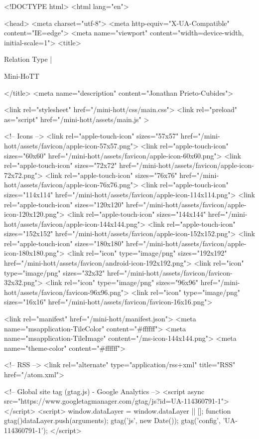<!DOCTYPE html>
<html lang="en">

<head>
  <meta charset="utf-8">
  <meta http-equiv="X-UA-Compatible" content="IE=edge">
  <meta name="viewport" content="width=device-width, initial-scale=1">
  <title>
    
      
        Relation Type |
      
        Mini-HoTT
    
  </title>
  <meta name="description" content="Jonathan Prieto-Cubides">

  <link rel="stylesheet" href="/mini-hott/css/main.css">
  <link rel="preload" as="script" href="/mini-hott/assets/main.js" >

  <!-- Icons -->
  <link rel="apple-touch-icon" sizes="57x57" href="/mini-hott/assets/favicon/apple-icon-57x57.png">
  <link rel="apple-touch-icon" sizes="60x60" href="/mini-hott/assets/favicon/apple-icon-60x60.png">
  <link rel="apple-touch-icon" sizes="72x72" href="/mini-hott/assets/favicon/apple-icon-72x72.png">
  <link rel="apple-touch-icon" sizes="76x76" href="/mini-hott/assets/favicon/apple-icon-76x76.png">
  <link rel="apple-touch-icon" sizes="114x114" href="/mini-hott/assets/favicon/apple-icon-114x114.png">
  <link rel="apple-touch-icon" sizes="120x120" href="/mini-hott/assets/favicon/apple-icon-120x120.png">
  <link rel="apple-touch-icon" sizes="144x144" href="/mini-hott/assets/favicon/apple-icon-144x144.png">
  <link rel="apple-touch-icon" sizes="152x152" href="/mini-hott/assets/favicon/apple-icon-152x152.png">
  <link rel="apple-touch-icon" sizes="180x180" href="/mini-hott/assets/favicon/apple-icon-180x180.png">
  <link rel="icon" type="image/png" sizes="192x192"  href="/mini-hott/assets/favicon/android-icon-192x192.png">
  <link rel="icon" type="image/png" sizes="32x32" href="/mini-hott/assets/favicon/favicon-32x32.png">
  <link rel="icon" type="image/png" sizes="96x96" href="/mini-hott/assets/favicon/favicon-96x96.png">
  <link rel="icon" type="image/png" sizes="16x16" href="/mini-hott/assets/favicon/favicon-16x16.png">

  <link rel="manifest" href="/mini-hott/manifest.json">
  <meta name="msapplication-TileColor" content="#ffffff">
  <meta name="msapplication-TileImage" content="/ms-icon-144x144.png">
  <meta name="theme-color" content="#ffffff">

  <!-- RSS -->
  <link rel="alternate" type="application/rss+xml" title="RSS" href="/atom.xml">

  <!-- Global site tag (gtag.js) - Google Analytics -->
  <script async src="https://www.googletagmanager.com/gtag/js?id=UA-114360791-1"></script>
  <script>
    window.dataLayer = window.dataLayer || [];
    function gtag(){dataLayer.push(arguments);}
    gtag('js', new Date());
    gtag('config', 'UA-114360791-1');
  </script>

